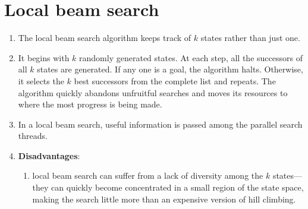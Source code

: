 \section{Local beam search \cite{ai/book/Artificial-Intelligence-A-Modern-Approach/Russell-Norvig}}
\label{AI: Algorithms/Local beam search}


\begin{enumerate}
    \item The local beam search algorithm keeps track of $k$ states rather than just one.
    \hfill \cite{ai/book/Artificial-Intelligence-A-Modern-Approach/Russell-Norvig}

    \item It begins with $k$ randomly generated states. 
    At each step, all the successors of all $k$ states are generated. 
    If any one is a goal, the algorithm halts. 
    Otherwise, it selects the $k$ best successors from the complete list and repeats.
    The algorithm quickly abandons unfruitful searches and moves its resources to where the most progress is being made.
    \hfill \cite{ai/book/Artificial-Intelligence-A-Modern-Approach/Russell-Norvig}

    \item In a local beam search, useful information is passed among the parallel search threads.
    \hfill \cite{ai/book/Artificial-Intelligence-A-Modern-Approach/Russell-Norvig}

    \item \textbf{Disadvantages}:
    \begin{enumerate}
        \item local beam search can suffer from a lack of diversity among the $k$ states—they can quickly become concentrated in a small region of the state space, making the search little more than an expensive version of hill climbing.
        \hfill \cite{ai/book/Artificial-Intelligence-A-Modern-Approach/Russell-Norvig}
    \end{enumerate}
\end{enumerate}




















